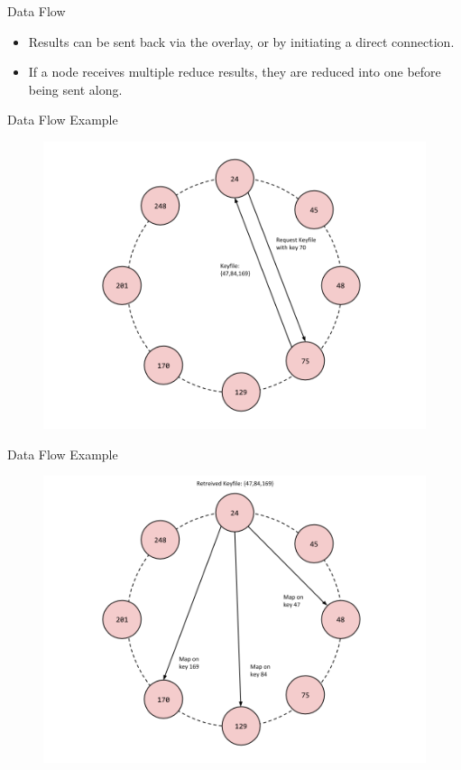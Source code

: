 \documentclass[11pt]{beamer}
\begin{document}
\begin{frame}{Data Flow}
\begin{itemize}
	\item Results can be sent back via the overlay, or by initiating a direct connection.
	\item If a node receives multiple reduce results, they are reduced into one before being sent along.
\end{itemize}
 
\end{frame}

\begin{frame}{Data Flow Example}
\begin{figure}
    \includegraphics[width=0.85\linewidth]{CR_dataflow1}
\end{figure}
\end{frame}

\begin{frame}{Data Flow Example}
\begin{figure}
    \includegraphics[width=0.85\linewidth]{CR_dataflow2}
\end{figure}
\end{frame}
\end{document}

